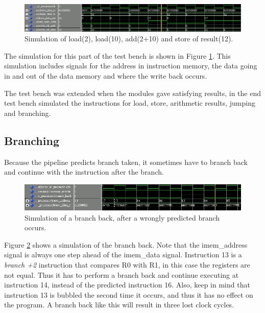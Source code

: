 \begin{figure}[ht]
    \centering
        \includegraphics[width=1\textwidth]{figures/sim-load-store-add}
    \caption{Simulation of load(2), load(10), add(2+10) and 
    store of result(12).}
    \label{sim-load-store-add}
\end{figure}

The simulation for this part of the test bench is shown in Figure
\ref{sim-load-store-add}. This simulation includes signals for the
address in instruction memory, the data going in and out of the
data memory and where the write back occurs.

The test bench was extended when the modules gave satisfying results,
in the end test bench simulated the instructions for load, store,
arithmetic results, jumping and branching.

\subsection{Branching}
Because the pipeline predicts branch taken, it sometimes have to 
branch back and continue with the instruction after the branch.

\begin{figure}[ht]
    \centering
        \includegraphics[width=1\textwidth]{figures/branch-back}
    \caption{Simulation of a branch back, after a wrongly predicted
    branch occurs.}
    \label{branch-back}
\end{figure}

Figure \ref{branch-back} shows a simulation of the branch back. Note
that the imem\_address signal is always one step ahead of the 
imem\_data signal.
Instruction 13 is a \textit{branch +2} instruction that compares
R0 with R1, in this case the registers are not equal. Thus it has 
to perform a branch back and continue executing at instruction 14, 
instead of the predicted instruction 16.  Also, keep in mind that 
instruction 13 is bubbled the second time it occurs, and thus it has 
no effect on the program. A branch back like this will result in three
lost clock cycles.


